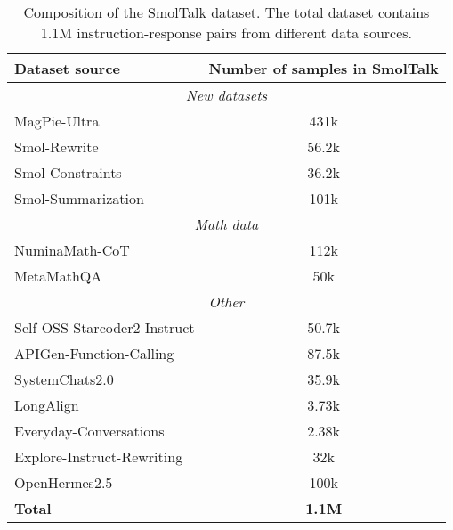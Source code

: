 \begin{table}[h!]
\centering
\caption{Composition of the SmolTalk dataset. The total dataset contains 1.1M instruction-response pairs from different data sources.}
\label{tab:smoltalk_composition}
\begin{tabular}{@{}lc@{}}
\toprule
\textbf{Dataset source} & \textbf{Number of samples in SmolTalk} \\ \midrule
\multicolumn{2}{c}{\textit{New datasets}} \\
\cmidrule{1-2}
MagPie-Ultra & 431k \\
Smol-Rewrite & 56.2k \\
Smol-Constraints & 36.2k \\
Smol-Summarization & 101k \\
\midrule
\multicolumn{2}{c}{\textit{Math data}}\\
\cmidrule{1-2}
NuminaMath-CoT & 112k \\
MetaMathQA & 50k \\
\midrule
\multicolumn{2}{c}{\textit{Other}} \\
\cmidrule{1-2}
Self-OSS-Starcoder2-Instruct & 50.7k \\
APIGen-Function-Calling & 87.5k \\
SystemChats2.0 & 35.9k \\
LongAlign & 3.73k \\
Everyday-Conversations & 2.38k \\
Explore-Instruct-Rewriting & 32k \\
OpenHermes2.5 & 100k \\ \midrule
\textbf{Total} & \textbf{1.1M} \\ \bottomrule
\end{tabular}
\end{table}